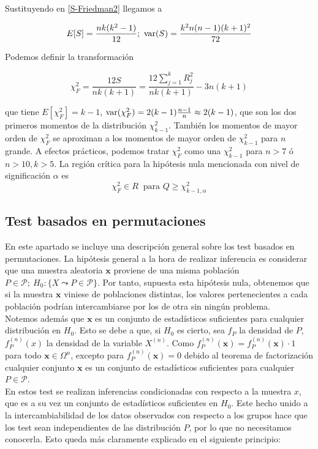 	Sustituyendo en \ref{S-Friedman2} llegamos a 
	
	\[ E[S] = \frac{nk(k^2-1)}{12}; \ 
		\var(S)= \frac{k^2n(n-1)(k+1)^2}{72} \]
	
	Podemos definir la transformación
	
	\[ \chi^2_F = \frac{12S}{nk(k+1)} = 
	\frac{12 \sum\limits_{j=1}^k R_j^2}{nk(k+1)} -3n(k+1)\]
	
	que tiene $E[\chi^2_F] = k-1$, $\text{var}(\chi^2_F)= 2(k-1)\frac{n-1}{n} \approx 2(k-1)$, que son los dos primeros momentos de la distribución $\chi^2_{k-1}$. También los momentos de mayor orden de $\chi^2_F$ se aproximan a los momentos de mayor orden de $\chi^2_{k-1}$ para $n$ grande. A efectos prácticos, podemos tratar $\chi^2_F$ como una $\chi^2_{k-1}$ para $n>7$ ó $n>10, k>5$. La región crítica para la hipótesis nula mencionada con nivel de significación $\alpha$ es
	\[ \chi^2_F \in R \ \text{ para } Q \geq \chi_{k-1,\alpha}^2 \]
	
\subsection{Test basados en permutaciones}
	
	En este apartado se incluye una descripción general sobre los test basados en permutaciones. La hipótesis general a la hora de realizar inferencia es considerar que una muestra aleatoria $\mathbf{x}$ proviene de una misma población $ P \in \mathcal{P};\ H_0: \{ X \leadsto P \in \mathcal{P} \}$. Por tanto, supuesta esta hipótesis nula, obtenemos que si la muestra $\mathbf{x}$ viniese de poblaciones distintas, los valores pertenecientes a cada población podrían intercambiarse por los de otra sin ningún problema.\\
	Notemos además que $\mathbf{x}$ es un conjunto de estadísticos suficientes para cualquier distribución en $H_0$. Esto se debe a que, si $H_0$ es cierto, sea $f_P$ la densidad de $P$, $f_P^{(n)}(x)$ la densidad de la variable $X^(n)$. Como $f_P^{(n)}(\mathbf{x}) = f_P^{(n)}(\mathbf{x}) \cdot 1$ para todo $\mathbf{x} \in \Omega^n$, excepto para $f_P^{(n)}(\mathbf{x}) = 0$ debido al teorema de factorización cualquier conjunto $\mathbf{x}$ es un conjunto de estadísticos suficientes para cualquier $P \in \mathcal{P}$.\\
	En estos test se realizan inferencias condicionadas con respecto a la muestra $x$, que es a su vez un conjunto de estadísticos suficientes en $H_0$. Este hecho unido a la intercambiabilidad de los datos observados con respecto a los grupos hace que los test sean independientes de las distribución $P$, por lo que no necesitamos conocerla. Esto queda más claramente explicado en el siguiente principio:

